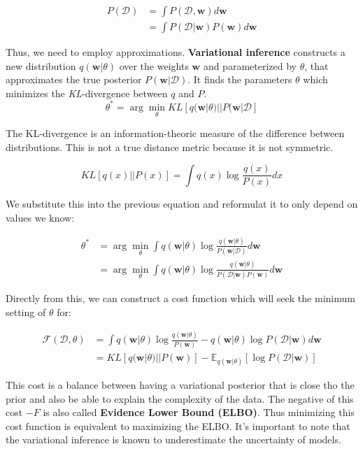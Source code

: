 \begin{align}
    P(\mathcal{D}) & = \int P(\mathcal{D}, \mathbf{w}) d\mathbf{w} \\
    & = \int P(\mathcal{D}|\mathbf{w}) P(\mathbf{w}) d\mathbf{w}
\end{align}


Thus, we need to employ approximations. \textbf{Variational inference} constructs a new distribution $q(\mathbf{w}|\theta)$ over the weights $\mathbf{w}$ and parameterized by $\theta$, that approximates the true posterior $P(\mathbf{w}|\mathcal{D})$. It finds the parameters $\theta$ which minimizes the \textit{KL}-divergence between $q$ and $P$.
\begin{equation}
    \theta^* = \arg\min_{\theta}KL[q(\mathbf{w}|\theta) || P(\mathbf{w}|\mathcal{D}]
\end{equation}

The KL-divergence is an information-theoric measure of the difference between distributions. This is not a true distance metric because it is not symmetric.

\begin{equation}
    KL[q(x)||P(x)] = \int q(x) \log \frac{q(x)}{P(x)}dx
\end{equation}

We substitute this into the previous equation and reformulat it to only depend on values we know:

\begin{align}
    \theta^* &= \arg\min_{\theta} \int q(\mathbf{w}|\theta) \log \frac{q(\mathbf{w}|\theta)}{P(\mathbf{w}|\mathcal{D})}d\mathbf{w} \\
    &= \arg\min_{\theta} \int q(\mathbf{w}|\theta) \log \frac{q(\mathbf{w}|\theta)}{P(\mathcal{D}|\mathbf{w})P(\mathbf{w})} d\mathbf{w}
\end{align}

Directly from this, we can construct a cost function which will seek the minimum setting of $\theta$ for:

\begin{align}
    \mathcal{F}(\mathcal{D}, \theta) &= \int q(\mathbf{w}|\theta) \log \frac{q(\mathbf{w}|\theta)}{P(\mathbf{w})} - q(\mathbf{w}|\theta)\log P(\mathcal{D}|\mathbf{w})d\mathbf{w} \\
    &= KL[q(\mathbf{w}|\theta)||P(\mathbf{w})] - \mathbb{E}_{q(\mathbf{w}|\theta)}[\log P(\mathcal{D}|\mathbf{w})]
\end{align}

This cost is a balance between having a variational posterior that is close tho the prior and also be able to explain the complexity of the data. The negative of this cost $-F$ is also called \textbf{Evidence Lower Bound (ELBO)}. Thus minimizing this cost function is equivalent to maximizing the ELBO. It's important to note that the variational inference is known to underestimate the uncertainty of models.


